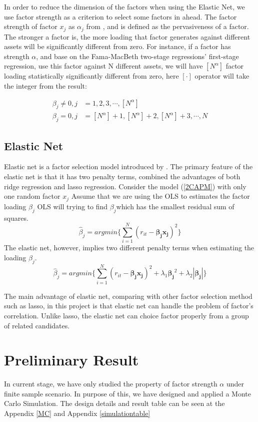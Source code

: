 \documentclass[12pt]{article}
\begin{document}
In order to reduce the dimension of the factors when using the Elastic Net, we use factor strength as a criterion to select some  factors in ahead.
The factor strength of factor $x_j$ as $\alpha_j$ from , and  is defined as the pervasiveness of a factor.
The stronger a factor is, the more loading that factor generates against different assets will be significantly different from zero. 
For instance, if a factor has strength $\alpha$, and base on the Fama-MacBeth two-stage regressions' first-stage regression, use this factor against N different assets, we will have $[N^\alpha]$ factor loading statistically significantly different from zero, here $[\cdot]$ operator will take the integer from the result:

\begin{align*}
\beta_j \neq 0, j &= 1, 2, 3, \cdots, [N^\alpha]\\
\beta_j = 0, j &= [N^\alpha ]+1 ,[N^\alpha]  +2, [N^\alpha] +3, \cdots, N
\end{align*}


\subsection{Elastic Net}

Elastic net  is a factor selection model introduced by .
The primary feature of the elastic net is that it has two penalty terms, combined the advantages of both ridge regression and lasso regression.
Consider the model (\ref{2CAPM}) with only one random factor $x_j$
Assume that we are using the OLS to estimates the factor loading $\beta_j$
OLS will trying to find $\beta_j$which has the smallest residual sum of squares. 
\[  \hat{\beta}_j  = argmin\{\sum_{i = 1}^{N}(r_{it} - \mathbf{\beta_j }\mathbf{x_j})^2\} \]
The elastic net, however, implies two different penalty terms when estimating the loading $\beta_j$.
	\[   \hat{\beta}_j  = argmin\{\sum_{i = 1}^{N}(r_{it} - \mathbf{\beta_j }\mathbf{x_j})^2 + \lambda_1\mathbf{\beta_j}^2  + \lambda_2|\mathbf{\beta_j}|  \label{ENcriterion} \tag{2}   \}    \]

The main advantage of elastic net, comparing with other factor selection method such as lasso, in this project is that elastic net can handle the problem of factor's correlation.
Unlike lasso, the elastic net can choice factor properly from a group of related candidates. 






\section{Preliminary Result}
In current stage, we have only studied the property of factor strength $\alpha$ under finite sample scenario.
In purpose of this, we have designed and applied a Monte Carlo Simulation.
The design details and result table can be seen at the Appendix \ref{MC} and Appendix \ref{simulationtable} 
\end{document}
